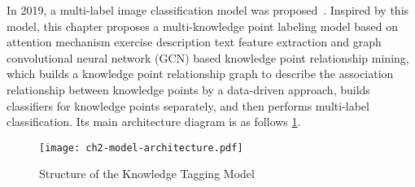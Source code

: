 
In 2019, a multi-label image classification model was proposed~\cite{chen2019multi}. Inspired by this model, this chapter proposes a multi-knowledge point labeling model based on attention mechanism exercise description text feature extraction and graph convolutional neural network (GCN) based knowledge point relationship mining, which builds a knowledge point relationship graph to describe the association relationship between knowledge points by a data-driven approach, builds classifiers for knowledge points separately, and then performs multi-label classification. Its main architecture diagram is as follows \figurename{\ref{fig:ch2-modelarchitecture}}.

\begin{figure}[H]
	\centering
	\texttt{[image: ch2-model-architecture.pdf]}
	\caption{Structure of the Knowledge Tagging Model}\label{fig:ch2-modelarchitecture}
\end{figure}





